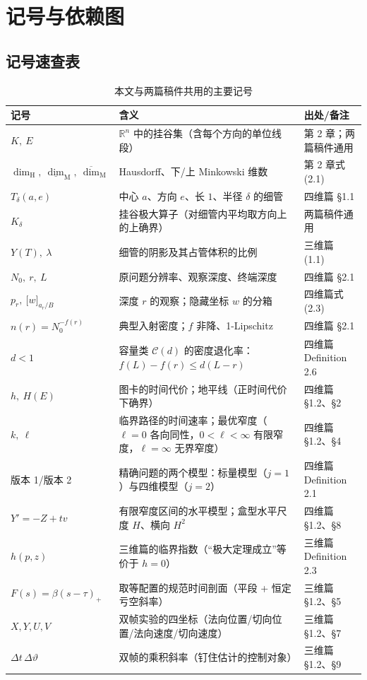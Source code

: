 \section{记号与依赖图}

\subsection{记号速查表}

\begin{table}[ht]
\centering
\caption{本文与两篇稿件共用的主要记号}
\label{tab:notation}
\footnotesize
\begin{tabularx}{\textwidth}{@{}L{3.5cm}L{5.6cm}Y@{}}
\toprule
{}\textbf{记号} & \textbf{含义} & \textbf{出处/备注} \\
\midrule
$K,\ E$ & $\mathbb{R}^n$ 中的挂谷集（含每个方向的单位线段） & 第 2 章；两篇稿件通用 \\
$\dim_{\mathrm{H}},\ \underline{\dim}_{\mathrm{M}},\ \overline{\dim}_{\mathrm{M}}$ & Hausdorff、下/上 Minkowski 维数 & 第 2 章式 (2.1) \\
$T_\delta(a,e)$ & 中心 $a$、方向 $e$、长 $1$、半径 $\delta$ 的细管 & 四维篇 §1.1 \\
$K_\delta$ & 挂谷极大算子（对细管内平均取方向上的上确界） & 两篇稿件通用 \\
$Y(T),\ \lambda$ & 细管的阴影及其占管体积的比例 & 三维篇 (1.1) \\
$N_0,\ r,\ L$ & 原问题分辨率、观察深度、终端深度 & 四维篇 §2.1 \\
$p_r,\ \bigl[w\bigr]_{a_r/B}$ & 深度 $r$ 的观察；隐藏坐标 $w$ 的分箱 & 四维篇式 (2.3) \\
$n(r)=N_0^{-f(r)}$ & 典型入射密度；$f$ 非降、1-Lipschitz & 四维篇 §2.1 \\
$d<1$ & 容量类 $\mathcal{C}(d)$ 的密度退化率：$f(L)-f(r)\le d(L-r)$ & 四维篇 Definition 2.6 \\
$h,\ H(E)$ & 图卡的时间代价；地平线（正时间代价下确界） & 四维篇 §1.2、§2 \\
$k,\ \ell$ & 临界路径的时间速率；最优窄度（$\ell=0$ 各向同性，$0<\ell<\infty$ 有限窄度，$\ell=\infty$ 无界窄度） & 四维篇 §1.2、§4 \\
版本 1/版本 2 & 精确问题的两个模型：标量模型（$j=1$）与四维模型（$j=2$） & 四维篇 Definition 2.1 \\
$Y'=-Z+tv$ & 有限窄度区间的水平模型；盒型水平尺度 $H$、横向 $H^2$ & 四维篇 §1.2、§8 \\
$h(p,z)$ & 三维篇的临界指数（“极大定理成立”等价于 $h=0$） & 三维篇 Definition 2.3 \\
$F(s)=\beta(s-\tau)_{+}$ & 取等配置的规范时间剖面（平段 + 恒定亏空斜率） & 三维篇 §1.2、§5 \\
$X,Y,U,V$ & 双帧实验的四坐标（法向位置/切向位置/法向速度/切向速度） & 三维篇 §1.2、§7 \\
$\Delta t\,\Delta\vartheta$ & 双帧的乘积斜率（钉住估计的控制对象） & 三维篇 §1.2、§9 \\
\bottomrule
\end{tabularx}
\end{table}

